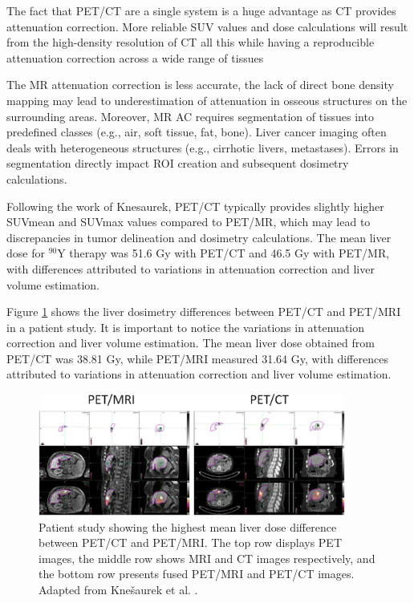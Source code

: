 The fact that PET/CT are a single system is a huge advantage as CT provides attenuation correction. More reliable SUV values and dose calculations will result from the high-density resolution of CT all this while having a reproducible attenuation correction across a wide range of tissues

The MR attenuation correction is less accurate, the lack of direct bone density mapping may lead to underestimation of attenuation in osseous structures on the surrounding areas. Moreover, MR AC requires segmentation of tissues into predefined classes (e.g., air, soft tissue, fat, bone). Liver cancer imaging often deals with heterogeneous structures (e.g., cirrhotic livers, metastases). Errors in segmentation directly impact ROI creation and subsequent dosimetry calculations. 


Following the work of Knesaurek, \cite{knesaurek2018} PET/CT typically provides slightly higher SUVmean and SUVmax values compared to PET/MR, which may lead to discrepancies in tumor delineation and dosimetry calculations. The mean liver dose for $^{90}\text{Y}$ therapy was 51.6 Gy with PET/CT and 46.5 Gy with PET/MR, with differences attributed to variations in attenuation correction and liver volume estimation.

Figure \ref{fig:patient_liver_dose} shows the liver dosimetry differences between PET/CT and PET/MRI in a patient study. It is important to notice the variations in attenuation correction and liver volume estimation. The mean liver dose obtained from PET/CT was 38.81 Gy, while PET/MRI measured 31.64 Gy, with differences attributed to variations in attenuation correction and liver volume estimation.

\begin{figure}[H]
	\centering
	\includegraphics[width=0.9\textwidth]{assets/Liver_Dosimetry_Differences.png} 
	\caption{Patient study showing the highest mean liver dose difference between PET/CT and PET/MRI. The top row displays PET images, the middle row shows MRI and CT images respectively, and the bottom row presents fused PET/MRI and PET/CT images. Adapted from Knešaurek et al. \cite{knesaurek2018}.}
	\label{fig:patient_liver_dose}
\end{figure}

